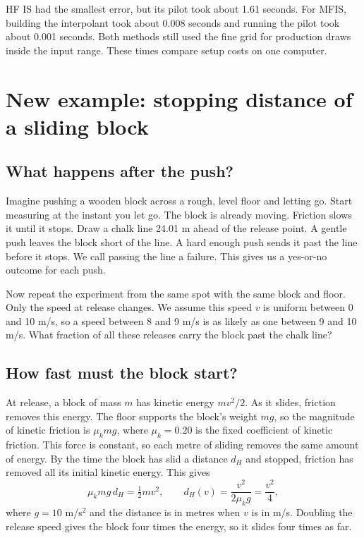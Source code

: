 \documentclass[11pt,a4paper]{article}
\begin{document}
HF IS had the smallest error, but its pilot took about 1.61 seconds. For MFIS, building the interpolant took about 0.008 seconds and running the pilot took about 0.001 seconds. Both methods still used the fine grid for production draws inside the input range. These times compare setup costs on one computer.

\section{New example: stopping distance of a sliding block}
\subsection{What happens after the push?}
Imagine pushing a wooden block across a rough, level floor and letting go. Start measuring at the instant you let go. The block is already moving. Friction slows it until it stops. Draw a chalk line 24.01 m ahead of the release point. A gentle push leaves the block short of the line. A hard enough push sends it past the line before it stops. We call passing the line a failure. This gives us a yes-or-no outcome for each push.

Now repeat the experiment from the same spot with the same block and floor. Only the speed at release changes. We assume this speed $v$ is uniform between 0 and 10 m/s, so a speed between 8 and 9 m/s is as likely as one between 9 and 10 m/s. What fraction of all these releases carry the block past the chalk line?

\subsection{How fast must the block start?}
At release, a block of mass $m$ has kinetic energy $mv^2/2$. As it slides, friction removes this energy. The floor supports the block's weight $mg$, so the magnitude of kinetic friction is $\mu_k mg$, where $\mu_k=0.20$ is the fixed coefficient of kinetic friction. This force is constant, so each metre of sliding removes the same amount of energy. By the time the block has slid a distance $d_H$ and stopped, friction has removed all its initial kinetic energy. This gives
\begin{equation}
\mu_k mg\,d_H=\tfrac12 mv^2,\qquad d_H(v)=\frac{v^2}{2\mu_k g}=\frac{v^2}{4},
\end{equation}
where $g=10$ m/s$^2$ and the distance is in metres when $v$ is in m/s. Doubling the release speed gives the block four times the energy, so it slides four times as far.
\end{document}
